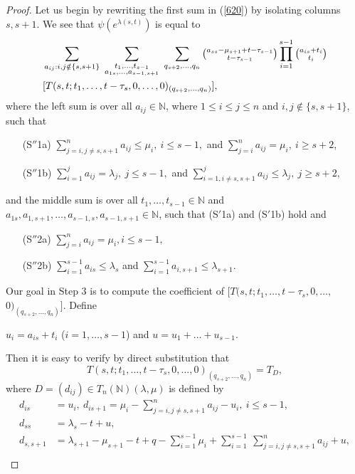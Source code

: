 \documentclass[ALCO,Unicode]{cedram}
\newcommand{\m}{\mu}
\newcommand{\la}{\lambda}
\numberwithin{equation}{section}
\begin{document}
\begin{proof}
Let us begin by rewriting the first sum in (\ref{620}) by isolating columns $s, s+1$. We see that $\psi(e^{\lambda (s,t)})$ is equal to 
\begin{align}\label{621}
	&\sum_{a_{ij}: i,j \notin \{s, s+1\}} \  \sum_{\substack{t_1,\dots,t_{s-1}\\a_{1s},\dots,a_{s-1,s+1}}} \  \sum_{q_{s+2},\dots,q_{n}}     \tbinom{a_{ss}-\m_{s+1}+t-\tau_{s-1}}{t-\tau_{s-1}}\prod_{i=1}^{s-1}\tbinom{a_{is}+t_i}{t_i} \\\nonumber& [T(s,t;t_1,\dots,t -\tau_{s},0,\dots,0)_{(q_{s+2},\dots,q_n)}], \end{align}
 where the left sum is over all $a_{ij} \in \mathbb{N}$, where $1 \le i \le j \le n$ and $i,j \notin \{s,s+1\}$, such that
\begin{enumerate}
	\item[(S$''$1a)] $\sum_{j=i, j \neq s, s+1}^{n} a_{ij} \le\mu_i, \  i \le s-1,$ and $\sum_{j=i}^{n} a_{ij}=\mu_i, \  i\ge s+2$,
	\item[(S$''$1b)]  $\sum_{i=1}^{j} a_{ij} = \lambda_j, \  j \le s-1,$ and $\sum_{i=1, i \neq s, s+1}^{j} a_{ij} \le \lambda_j, \  j \ge s+2,$
\end{enumerate}	
and the middle sum is over all  $t_1,\dots,t_{s-1} \in \mathbb{N} $ and $a_{1s},a_{1,s+1},\dots,a_{s-1,s} , a_{s-1,s+1} \in \mathbb{N}$, such that (S$'$1a) and (S$'$1b) hold and 
\begin{enumerate}
	\item[(S$''$2a)] $\sum_{j=i}^{n} a_{ij} = \mu_i, i \le s-1,$
	\item[(S$''$2b)]  $\sum_{i=1}^{s-1} a_{is} \le \lambda_s$ and $\sum_{i=1}^{s-1} a_{i,s+1} \le \lambda_{s+1}.$
\end{enumerate}	
Our goal in Step 3 is to compute the coefficient of $[T(s,t;t_1,\dots,t -\tau_{s},0,\dots,$ $0)_{(q_{s+2},\dots,q_n)}]$. Define 	\begin{center}
	$u_i=a_{is}+t_i$ ($i=1,\dots,s-1$) and $u=u_1+\dots+u_{s-1}$.
\end{center} Then it is easy to verify by direct substitution that \[T(s,t;t_1,\dots,t-\tau_s,0,\dots,0)_{(q_{s+2},\dots,q_n)}=T_D,\] where $D=(d_{ij}) \in T_{n}(\mathbb{N})(\la, \mu)$ is defined by 	\begin{align}	
	d_{is}&=u_i, \  d_{is+1}=\mu_i-\sum_{j=i, j\neq s,s+1}^na_{ij}-u_i, \  i \le s-1, \\\nonumber
	d_{ss}&=\lambda_s-t+u, \\\nonumber d_{s,s+1}&=\lambda_{s+1} -\mu_{s+1}-t+q-\sum_{i=1}^{s-1}\mu_i+\sum_{i=1}^{s-1} \  \sum_{j=i, j \neq s,s+1}^{n} a_{ij}+u,  \\\nonumber

\end{align}
\end{proof}
\end{document}
